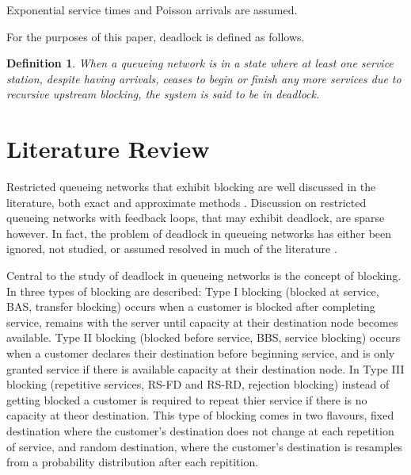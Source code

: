 \documentclass{article}
\newtheorem{definition}{Definition}
\begin{document}
Exponential service times and Poisson arrivals are assumed.

For the purposes of this paper, deadlock is defined as follows.\\

\begin{definition}
    When a queueing network is in a state where at least one service station,
    despite having arrivals, ceases to begin or finish any more services
    due to recursive upstream blocking, the system is said to be in deadlock.
\end{definition}



\section{Literature Review}\label{sec:litreview}


Restricted queueing networks that exhibit blocking are well discussed in the literature, both exact \cite{hunt56, baber08, aviitzhakyadin65, koizumietal05, latoucheneuts80, perrosetal88} and approximate methods \cite{takahashi80, korporaaletal00, onvural90, perrosetal88}. Discussion on restricted queueing networks with feedback loops, that may exhibit deadlock, are sparse however.
In fact, the problem of deadlock in queueing networks has either been ignored, not studied, or assumed resolved in much of the literature \cite{onvural90, perrosetal88}.

Central to the study of deadlock in queueing networks is the concept of blocking.
In \cite{onvuralperros86} three types of blocking are described:
Type I blocking (blocked at service, BAS, transfer blocking) occurs when a customer is blocked after completing service, remains with the server until capacity at their destination node becomes available.
Type II blocking (blocked before service, BBS, service blocking) occurs when a customer declares their destination before beginning service, and is only granted service if there is available capacity at their destination node.
In Type III blocking (repetitive services, RS-FD and RS-RD, rejection blocking) instead of getting blocked a customer is required to repeat thier service if there is no capacity at theor destination. This type of blocking comes in two flavours, fixed destination where the customer's destination does not change at each repetition of service, and random destination, where the customer's destination is resamples from a probability distribution after each repitition.
\end{document}
